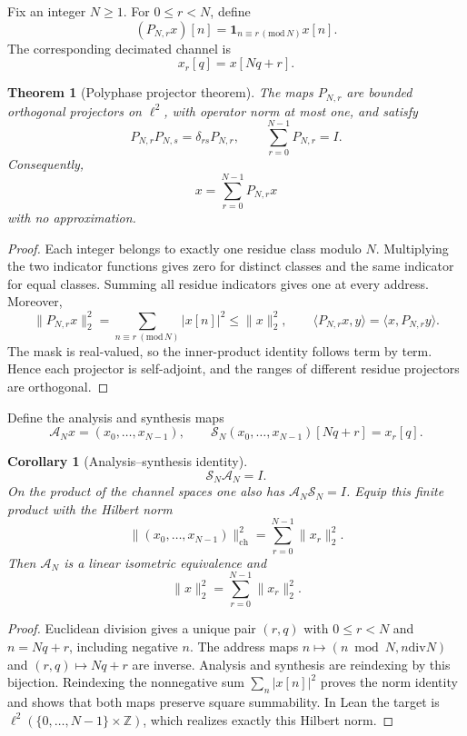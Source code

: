 \documentclass[11pt,letterpaper]{article}
\newtheorem{theorem}{Theorem}[section]
\theoremstyle{plain}
\theoremstyle{plain}
\theoremstyle{plain}
\newtheorem{corollary}[corollary]{Corollary}
\theoremstyle{definition}
\theoremstyle{definition}
\theoremstyle{definition}
\theoremstyle{definition}
\theoremstyle{remark}
\theoremstyle{remark}
\theoremstyle{remark}
\theoremstyle{remark}
\newcommand{\cA}{\mathcal A}
\newcommand{\cS}{\mathcal S}
\newcommand{\bbZ}{\mathbb Z}
\let\KomorebiPrimitiveMathbin\mathbin
\renewcommand{\mathbin}[1]{\KomorebiPrimitiveMathbin{#1}}
\begin{document}
Fix an integer $N\ge1$. For $0\le r<N$, define
\[
(P_{N,r}x)[n]
=
\mathbf 1_{n\equiv r\, (\mathrm{mod}\,N)}x[n].
\]
The corresponding decimated channel is
\[
x_r[q]=x[Nq+r].
\]

\begin{theorem}[Polyphase projector theorem]\label{result:02}
The maps $P_{N,r}$ are bounded orthogonal projectors on $\ell^2$, with operator norm at most one, and satisfy
\[
P_{N,r}P_{N,s}=\delta_{rs}P_{N,r},
\qquad
\sum_{r=0}^{N-1}P_{N,r}=I.
\]
Consequently,
\[
\boxed{x=\sum_{r=0}^{N-1}P_{N,r}x}
\]
with no approximation.
\end{theorem}

\begin{proof}
Each integer belongs to exactly one residue class modulo $N$. Multiplying the two indicator functions gives zero for distinct classes and the same indicator for equal classes. Summing all residue indicators gives one at every address. Moreover,
\[
\|P_{N,r}x\|_2^2=\sum_{n\equiv r\ (\mathrm{mod}\,N)}|x[n]|^2\le\|x\|_2^2,
\qquad
\langle P_{N,r}x,y\rangle=\langle x,P_{N,r}y\rangle.
\]
The mask is real-valued, so the inner-product identity follows term by term. Hence each projector is self-adjoint, and the ranges of different residue projectors are orthogonal.
\end{proof}

Define the analysis and synthesis maps
\[
\cA_Nx=(x_0,\ldots,x_{N-1}),
\qquad
\cS_N(x_0,\ldots,x_{N-1})[Nq+r]=x_r[q].
\]

\begin{corollary}[Analysis--synthesis identity]\label{result:03}
\[
\boxed{\cS_N\cA_N=I.}
\]
On the product of the channel spaces one also has $\cA_N\cS_N=I$. Equip this finite product with the Hilbert norm
\[
\|(x_0,\ldots,x_{N-1})\|_{\mathrm{ch}}^2
=\sum_{r=0}^{N-1}\|x_r\|_2^2.
\]
Then $\cA_N$ is a linear isometric equivalence and
\[
\|x\|_2^2=\sum_{r=0}^{N-1}\|x_r\|_2^2.
\]
\end{corollary}
\begin{proof}
Euclidean division gives a unique pair $(r,q)$ with $0\le r<N$ and $n=Nq+r$, including negative $n$. The address maps $n\mapsto(n\bmod N,n\mathbin{\mathrm{div}}N)$ and $(r,q)\mapsto Nq+r$ are inverse. Analysis and synthesis are reindexing by this bijection. Reindexing the nonnegative sum $\sum_n|x[n]|^2$ proves the norm identity and shows that both maps preserve square summability. In Lean the target is $\ell^2(\{0,\ldots,N-1\}\times\bbZ)$, which realizes exactly this Hilbert norm.
\end{proof}
\end{document}
